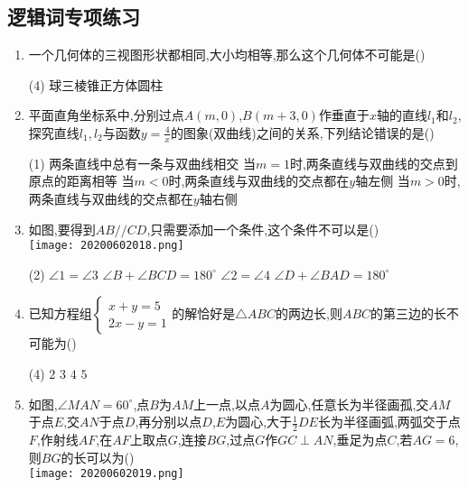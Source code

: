 \documentclass[cn,blue,12pt]{elegantbook}
\renewcommand \tkt[1]{{\CJKunderline[hidden=true, skip=true, thickness=1pt]{#1}}}
\begin{document}
\subsection{逻辑词专项练习}%
\begin{enumerate}
\item 一个几何体的三视图形状都相同,大小均相等,那么这个几何体不可能是(\tkt{D})\\
\begin{tasks}(4)
\task 球\task 三棱锥\task 正方体\task 圆柱
\end{tasks}
\item 平面直角坐标系中,分别过点\(A(m,0)\),\(B(m+3,0)\)作垂直于\(x\)轴的直线\(l_1\)和\(l_2\),探究直线\(l_1,l_2\)与函数\(y = \frac{4}{x}\)的图象(双曲线)之间的关系,下列结论错误的是(\tkt{C})\\
\begin{tasks}(1)
\task 两条直线中总有一条与双曲线相交
\task 当\(m = 1\)时,两条直线与双曲线的交点到原点的距离相等
\task 当\(m<0\)时,两条直线与双曲线的交点都在\(y\)轴左侧
\task 当\(m>0\)时,两条直线与双曲线的交点都在\(y\)轴右侧
\end{tasks}
\item 如图,要得到\(AB//CD\),只需要添加一个条件,这个条件不可以是(\tkt{A})\\
\texttt{[image: 20200602018.png]}\\
\begin{tasks}(2)
\task \(\angle 1=\angle 3\)
\task \(\angle B+\angle BCD=180^\circ\)
\task \(\angle 2=\angle 4\)
\task \(\angle D+\angle BAD=180^\circ\)
\end{tasks}
\item 已知方程组\( \begin{cases} x+y=5\\ 2x-y=1\end{cases}\)的解恰好是\(\triangle ABC\)的两边长,则\(ABC\)的第三边的长不可能为(\tkt{D})\\
\begin{tasks}(4)
\task \(2\)
\task \(3\)
\task \(4\)
\task \(5\)
\end{tasks}
\item 如图,\(\angle MAN =60^\circ\),点\(B\)为\(AM\)上一点,以点\(A\)为圆心,任意长为半径画孤,交\(AM\)于点\(E\),交\(AN\)于点\(D\),再分别以点\(D\),\(E\)为圆心,大于\(\frac{1}{2}DE\)长为半径画弧,两弧交于点\(F\),作射线\(AF\),在\(AF\)上取点\(G\),连接\(BG\),过点\(G\)作\(GC\perp AN\),垂足为点\(C\),若\(AG=6\),则\(BG\)的长可以为(\tkt{D})\\
\texttt{[image: 20200602019.png]}\\

\end{enumerate}
\end{document}
